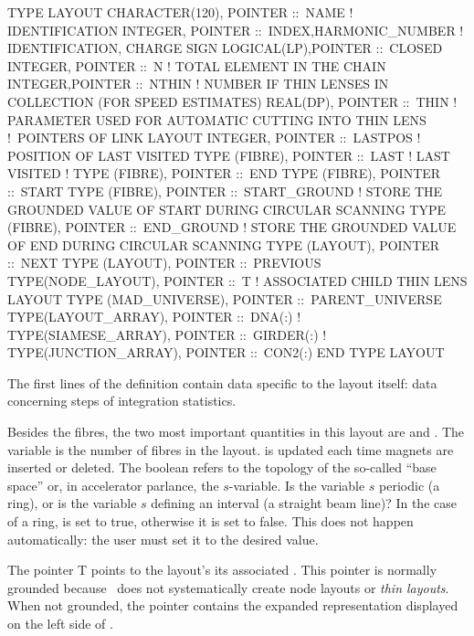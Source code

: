 \begin{ptccode}
TYPE LAYOUT
  CHARACTER(120), POINTER ::\  NAME  ! IDENTIFICATION
  INTEGER, POINTER ::\  INDEX,HARMONIC_NUMBER  ! IDENTIFICATION, CHARGE SIGN
  LOGICAL(LP),POINTER ::\ CLOSED
  INTEGER,  POINTER ::\ N  ! TOTAL ELEMENT IN THE CHAIN
  INTEGER,POINTER ::\ NTHIN
  ! NUMBER IF THIN LENSES IN COLLECTION  (FOR SPEED ESTIMATES)
  REAL(DP),  POINTER ::\ THIN
  ! PARAMETER USED FOR AUTOMATIC CUTTING INTO THIN LENS
  !\ POINTERS OF LINK LAYOUT
  INTEGER, POINTER ::\ LASTPOS  ! POSITION OF LAST VISITED
  TYPE (FIBRE), POINTER ::\ LAST  ! LAST VISITED
  !
  TYPE (FIBRE), POINTER ::\ END
  TYPE (FIBRE), POINTER ::\ START
  TYPE (FIBRE), POINTER ::\ START_GROUND
  ! STORE THE GROUNDED VALUE OF START DURING CIRCULAR SCANNING
  TYPE (FIBRE), POINTER ::\ END_GROUND
  ! STORE THE GROUNDED VALUE OF END DURING CIRCULAR SCANNING
  TYPE (LAYOUT), POINTER ::\ NEXT
  TYPE (LAYOUT), POINTER ::\ PREVIOUS
  TYPE(NODE_LAYOUT), POINTER ::\ T  !  ASSOCIATED  CHILD THIN LENS LAYOUT
  TYPE (MAD_UNIVERSE), POINTER ::\ PARENT_UNIVERSE
  TYPE(LAYOUT_ARRAY), POINTER ::\ DNA(:)
  !   TYPE(SIAMESE_ARRAY), POINTER ::\ GIRDER(:)
  !   TYPE(JUNCTION_ARRAY), POINTER ::\ CON2(:)
END TYPE LAYOUT
\end{ptccode}

The first lines of the  definition contain data specific to the layout
itself: data concerning steps of integration statistics.

Besides the fibres, the two most important quantities in this layout are 
and . The variable  is the number of fibres in the layout.
 is updated each time magnets are inserted or deleted. The boolean 
 refers to the topology of the so-called ``base space'' or, in
accelerator parlance, the $s$-variable. Is the variable $s$ periodic (a ring),
or is the variable $s$ defining an interval (a straight beam line)? In the case of
a ring,  is set to true, otherwise it is set to false. This does not
happen automatically: the user must set it to the desired value.

The pointer T points to the layout's its associated .
This pointer is normally grounded because \PTC\ does not systematically
create node layouts or \emph{thin layouts}. When not grounded, the pointer
contains the expanded representation displayed on the left side of
.


